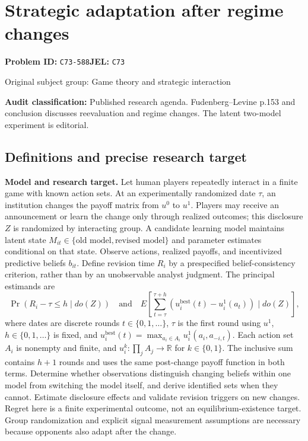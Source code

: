 \documentclass[11pt,a4paper]{article}
\newcommand{\R}{\mathbb R}
\begin{document}
\section*{Strategic adaptation after regime changes}
\textbf{Problem ID:} \texttt{C73-588}\quad \textbf{JEL:} \texttt{C73}\par
\label{problem:OP-0283}
{\sffamily\small\color{muted}Original subject group: Game theory and strategic interaction\par}
\label{definitions:problem:30007565}
\textbf{Audit classification:} Published research agenda. Fudenberg–Levine p.153 and conclusion discusses reevaluation and regime changes. The latent two-model experiment is editorial.
\subsection*{Definitions and precise research target}
\textbf{Model and research target.} Let human players repeatedly interact in a finite game with known action sets. At an experimentally randomized date \(\tau\), an institution changes the payoff matrix from \(u^0\) to \(u^1\). Players may receive an announcement or learn the change only through realized outcomes; this disclosure \(Z\) is randomized by interacting group. A candidate learning model maintains latent state \(M_{it}\in\{\text{old model},\text{revised model}\}\) and parameter estimates conditional on that state. Observe actions, realized payoffs, and incentivized predictive beliefs \(b_{it}\). Define revision time \(R_i\) by a prespecified belief-consistency criterion, rather than by an unobservable analyst judgment. The principal estimands are
\[
 \Pr(R_i-\tau\leq h\mid do(Z))
 \quad\text{and}\quad
 E\left[\sum_{t=\tau}^{\tau+h}(u_i^{\mathrm{best}}(t)-u_i^1(a_t))\mid do(Z)\right],
\]
where dates are discrete rounds \(t\in\{0,1,\ldots\}\), \(\tau\) is the first round using \(u^1\), \(h\in\{0,1,\ldots\}\) is fixed, and \(u_i^{\mathrm{best}}(t)=\max_{a_i\in A_i}u_i^1(a_i,a_{-i,t})\). Each action set \(A_i\) is nonempty and finite, and \(u_i^k:\prod_j A_j\to\R\) for \(k\in\{0,1\}\). The inclusive sum contains \(h+1\) rounds and uses the same post-change payoff function in both terms. Determine whether observations distinguish changing beliefs within one model from switching the model itself, and derive identified sets when they cannot. Estimate disclosure effects and validate revision triggers on new changes. Regret here is a finite experimental outcome, not an equilibrium-existence target. Group randomization and explicit signal measurement assumptions are necessary because opponents also adapt after the change.
\end{document}
